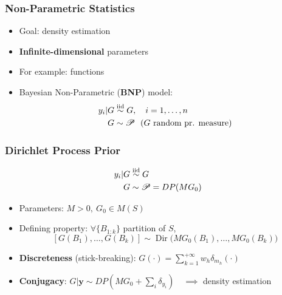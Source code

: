 

\begin{frame}
	\frametitle{Non-Parametric Statistics}
	\begin{itemize}
		\item Goal: density estimation
		\item \textbf{Infinite-dimensional} parameters
		\item For example: functions
		\item Bayesian Non-Parametric (\textbf{BNP}) model:
		\begin{align*}
			y_i | G &\iidsim G, \quad i=1,\dots,n \\
			G &\sim \mathscr P \ \ \text{($G$ random pr. measure)} %
		\end{align*}
	\end{itemize}
\end{frame}

\begin{frame}
	\frametitle{Dirichlet Process Prior}
	\begin{align*}
		y_i | G &\stackrel{\text{iid}}{\sim} G \\
		G &\sim \mathscr P = DP(M G_0)
	\end{align*}
	\vspace{-10pt}
	\begin{itemize}
		\item Parameters: $M > 0, \ G_0 \in M(S)$
		\vspace{5pt}
		\item Defining property: $\forall \{B_{1:k}\}$ partition of $S$,
		$$[G(B_1),\dots,G(B_k)] \sim \operatorname{Dir}
			\big( M G_0(B_1),\dots, M G_0(B_k) \big)$$
		\vspace{-15pt}
		\item \textbf{Discreteness} (stick-breaking): $G(\cdot) = \sum_{k=1}^{+\infty} w_h \delta_{m_h} (\cdot)$
		\vspace{10pt}
		\item \textbf{Conjugacy}: $G | \mathbf{y} \sim DP(M G_0 + \sum_i \delta_{y_i}) \quad \implies$ density estimation
	\end{itemize}
\end{frame}


